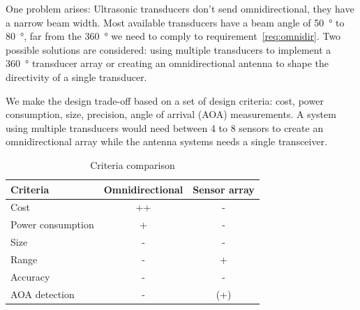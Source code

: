 One problem arises: Ultrasonic transducers don't send omnidirectional, they have a narrow beam width.
Most available transducers have a beam angle of \SI{50}{\degree} to \SI{80}{\degree}, far from the \SI{360}{\degree} we need to comply to requirement~\ref{req:omnidir}.
Two possible solutions are considered: using multiple transducers to implement a \SI{360}{\degree} transducer array or creating an omnidirectional antenna to shape the directivity of a single transducer.

We make the design trade-off based on a set of design criteria: cost, power consumption, size, precision, angle of arrival (AOA) measurements.
A system using multiple transducers would need between 4 to 8 sensors to create an omnidirectional array while the antenna systems needs a single transceiver.

\begin{table}[H]
\centering
\begin{tabular}{|l|c|c|}
    \hline
    Criteria            & Omnidirectional   & Sensor array \\
    \hline
    Cost                & ++ & -  \\
    Power consumption   & + & - \\
    Size                & - & - \\
    Range               & - & + \\
    Accuracy            & - & - \\
    AOA detection       & - & (+) \\
    \hline
\end{tabular}
\caption{Criteria comparison}
\label{tab:ant_crit}
\end{table}


